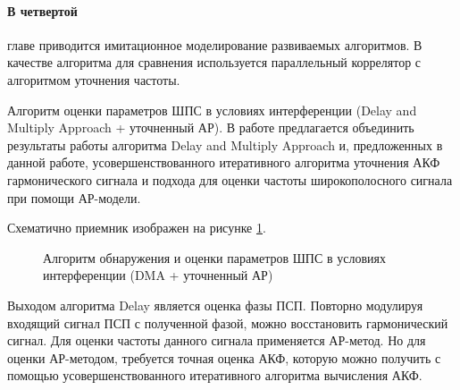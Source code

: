 \paragraph{В четвертой} главе приводится имитационное моделирование развиваемых алгоритмов. В качестве алгоритма
для сравнения используется параллельный коррелятор с алгоритмом уточнения частоты.

Алгоритм оценки параметров ШПС в условиях интерференции (Delay and Multiply Approach + уточненный АР).
В работе предлагается объединить результаты работы алгоритма Delay and Multiply Approach и, предложенных
в данной работе, усовершенствованного итеративного алгоритма уточнения АКФ гармонического
сигнала и подхода для оценки частоты широкополосного сигнала при помощи АР-модели.

Схематично приемник изображен на рисунке \ref{pic:ar_dma_scheme}.

\begin{figure}[H]
\center{}
	\caption{Алгоритм обнаружения и оценки параметров ШПС в условиях интерференции (DMA + уточненный АР)}
	\label{pic:ar_dma_scheme}
\end{figure}

Выходом алгоритма Delay  является оценка фазы ПСП. Повторно модулируя входящий сигнал ПСП с полученной
фазой, можно восстановить гармонический сигнал. Для оценки частоты данного сигнала применяется
АР-метод. Но для оценки АР-методом, требуется точная оценка АКФ, которую можно получить
с помощью усовершенствованного итеративного алгоритма вычисления АКФ.

